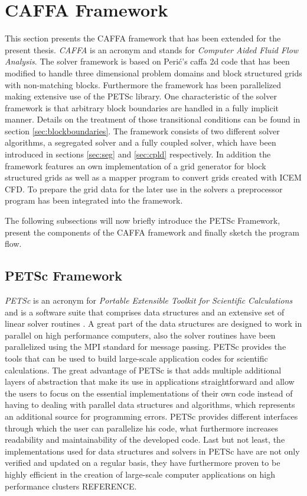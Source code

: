 \section{CAFFA Framework}

This section presents the CAFFA framework that has been extended for the present thesis. \emph{CAFFA} is an acronym and stands for \emph{Computer Aided Fluid Flow Analysis}. The solver framework is based on Peri\'c's caffa 2d code \cite{caffawebpage} that has been modified to handle three dimensional problem domains and block structured grids with non-matching blocks. Furthermore the framework has been parallelized making extensive use of the PETSc library. One characteristic of the solver framework is that arbitrary block boundaries are handled in a fully implicit manner. Details on the treatment of those transitional conditions can be found in section \ref{sec:blockboundaries}. The framework consists of two different solver algorithms, a segregated solver and a fully coupled solver, which have been introduced in sections \ref{sec:seg} and \ref{sec:cpld} respectively. In addition the framework features an own implementation of a grid generator for block structured grids as well as a mapper program to convert grids created with ICEM CFD. To prepare the grid data for the later use in the solvers a preprocessor program has been integrated into the framework. 

The following subsections will now briefly introduce the PETSc Framework, present the components of the CAFFA framework and finally sketch the program flow.

\subsection{PETSc Framework}

\emph{PETSc} is an acronym for \emph{Portable Extensible Toolkit for Scientific Calculations} and is a software suite that comprises data structures and an extensive set of linear solver routines \cite{petsc-web-page,petsc-efficient}. A great part of the data structures are designed to work in parallel on high performance computers, also the solver routines have been parallelized using the MPI standard for message passing. PETSc provides the tools that can be used to build large-scale application codes for scientific calculations. The great advantage of PETSc is that adds multiple additional layers of abstraction that make its use in applications straightforward and allow the users to focus on the essential implementations of their own code instead of having to dealing with parallel data structures and algorithms, which represents an additional source for programming errors. PETSc provides different interfaces through which the user can parallelize his code, what furthermore increases readability and maintainability of the developed code. Last but not least, the implementations used for data structures and solvers in PETSc have are not only verified and updated on a regular basis, they have furthermore proven to be highly efficient in the creation of large-scale computer applications on high performance clusters REFERENCE.


